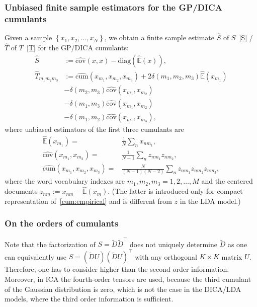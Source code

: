 \documentclass{article}
\newcommand{\rbra}[1]{\left(#1\right)}
\newcommand{\cbra}[1]{\left\{#1\right\}}
\newcommand{\wt}[1]{\widetilde{#1}}
\newcommand{\wh}[1]{\widehat{#1}}
\newcommand{\diag}{\mathrm{diag}}
\newcommand{\gd}{\delta}
\newcommand{\ebb}{\mathbb{E}}
\newcommand{\webb}{\wh{\ebb}}
\newcommand{\cov}{\mathrm{cov}}
\newcommand{\wcov}{\wh{\cov}}
\newcommand{\cum}{\mathrm{cum}}
\newcommand{\wcum}{\wh{\cum}}
\begin{document}
\subsubsection{Unbiased finite sample estimators for the GP/DICA cumulants} \label{sec:dica:fs}
Given a sample $\cbra{x_1,x_2,\dots,x_N}$, we obtain a finite sample estimate $\wh{S}$ of $S$~\eqref{S} / $\wh{T}$ of $T$~\eqref{T} for the GP/DICA cumulants:
\begin{align}
\label{appSgp:fs} \wh{S} &:=\wcov(x,x) - \diag\rbra{\webb(x)}, \\
\nonumber \wh{T}_{m_1m_2m_3} &:=  \wcum(x_{m_1},x_{m_2},x_{m_3})+ 2\gd(m_1,m_2,m_3)\webb(x_{m_1}) \\
\nonumber &- \gd(m_2,m_3)\wcov(x_{m_1},x_{m_2})\\
\nonumber & - \gd(m_1,m_3)\wcov(x_{m_1},x_{m_2})\\
\label{appTgp:fs}& - \gd(m_1,m_2) \wcov(x_{m_1},x_{m_3}),
\end{align}
where unbiased estimators of the first three cumulants are
\begin{equation}\label{cum:empirical}
\begin{aligned}
\wh{\ebb}(x_{m_1}) =& \frac{1}{N} \sum_n x_{nm_1}, \\
\wh{\cov}(x_{m_1},x_{m_2}) =& \frac{1}{N-1} \sum_n z_{nm_1}  z_{nm_2}, \\
\wh{\cum}(x_{m_1},x_{m_2},x_{m_3}) =& \frac{N}{(N-1)(N-2)} \sum_n z_{nm_1}  z_{nm_2}  z_{nm_3},
\end{aligned}
\end{equation}
where the word vocabulary indexes are $m_1, m_2, m_3 = 1,2,\dots,M$ and the centered documents $z_{nm} := x_{nm} - \wh{\ebb}(x_m)$. (The latter is introduced only for compact representation of~\eqref{cum:empirical} and is different from $z$ in the LDA model.)



\subsubsection{On the orders of cumulants}\label{sec:on-the-orders-of-cumulants}
Note that the factorization of $S = \wt{D}\wt{D}^{\top}$ does not uniquely determine $\wt{D}$ as one can equivalently use $S = (\wt{D}U)(\wt{D}U)^{\top}$ with any orthogonal $K \times K$ matrix $U$. Therefore, one has to consider higher than the second order information. Moreover, in ICA the fourth-order tensors are used, because the third cumulant of the Gaussian distribution is zero, which is not the case in the DICA/LDA models, where the third order information is sufficient.
\end{document}
